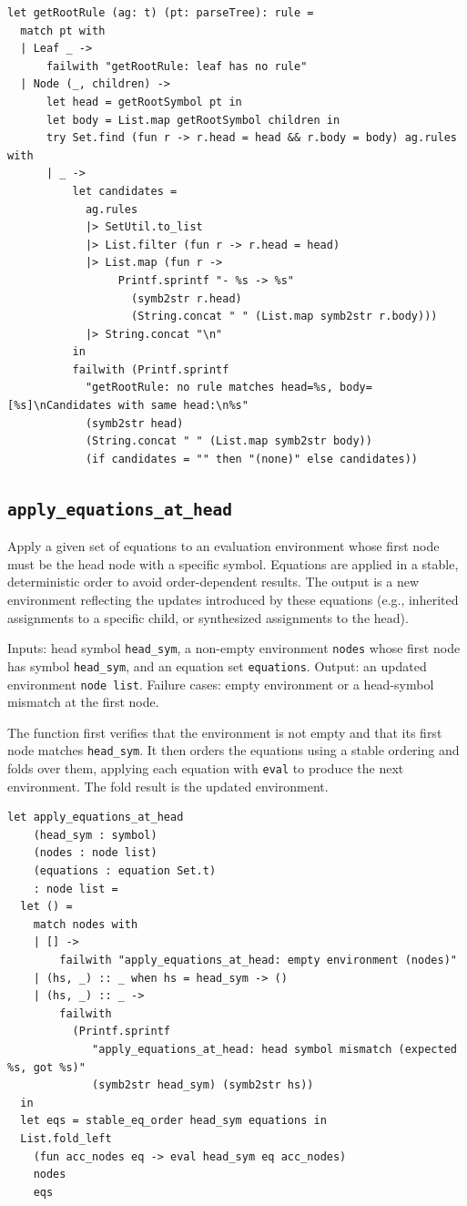 \begin{verbatim}
let getRootRule (ag: t) (pt: parseTree): rule =
  match pt with
  | Leaf _ ->
      failwith "getRootRule: leaf has no rule"
  | Node (_, children) ->
      let head = getRootSymbol pt in
      let body = List.map getRootSymbol children in
      try Set.find (fun r -> r.head = head && r.body = body) ag.rules with
      | _ ->
          let candidates =
            ag.rules
            |> SetUtil.to_list
            |> List.filter (fun r -> r.head = head)
            |> List.map (fun r ->
                 Printf.sprintf "- %s -> %s"
                   (symb2str r.head)
                   (String.concat " " (List.map symb2str r.body)))
            |> String.concat "\n"
          in
          failwith (Printf.sprintf
            "getRootRule: no rule matches head=%s, body=[%s]\nCandidates with same head:\n%s"
            (symb2str head)
            (String.concat " " (List.map symb2str body))
            (if candidates = "" then "(none)" else candidates))
\end{verbatim}

\subsection{\texttt{apply\_equations\_at\_head}}

Apply a given set of equations to an evaluation environment whose first node must be the head node with a specific symbol. 
Equations are applied in a stable, deterministic order to avoid order-dependent results. The output is a new environment reflecting 
the updates introduced by these equations (e.g., inherited assignments to a specific child, or synthesized assignments to the head). 


Inputs: head symbol \texttt{head\_sym}, a non-empty environment \texttt{nodes} whose first node has symbol \texttt{head\_sym}, and an equation set \texttt{equations}.  
Output: an updated environment \texttt{node list}.  
Failure cases: empty environment or a head-symbol mismatch at the first node. 

The function first verifies that the environment is not empty and that its first node matches \texttt{head\_sym}. It then orders the equations using a 
stable ordering and folds over them, applying each equation with \texttt{eval} to produce the next environment. The fold result is the updated environment. 

\begin{verbatim}
let apply_equations_at_head
    (head_sym : symbol)
    (nodes : node list)
    (equations : equation Set.t)
    : node list =
  let () =
    match nodes with
    | [] ->
        failwith "apply_equations_at_head: empty environment (nodes)"
    | (hs, _) :: _ when hs = head_sym -> ()
    | (hs, _) :: _ ->
        failwith
          (Printf.sprintf
             "apply_equations_at_head: head symbol mismatch (expected %s, got %s)"
             (symb2str head_sym) (symb2str hs))
  in
  let eqs = stable_eq_order head_sym equations in
  List.fold_left
    (fun acc_nodes eq -> eval head_sym eq acc_nodes)
    nodes
    eqs
\end{verbatim}


